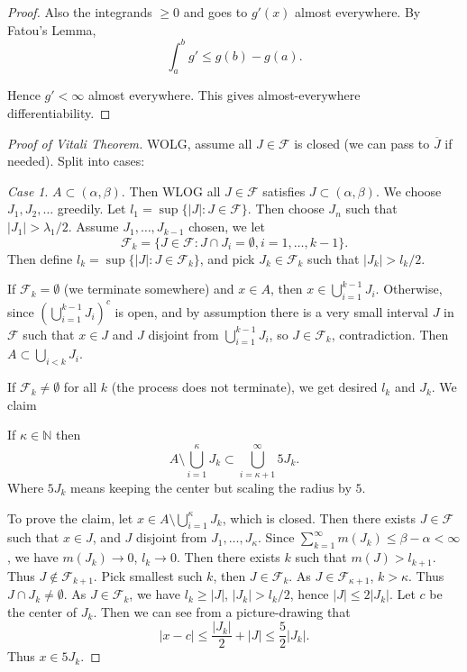 \begin{proof}
Also the integrands $\ge 0$ and goes to $g'(x)$ almost everywhere. By Fatou's Lemma,
\[
	\int _a^b g' \le  g(b) - g(a)
.\] 

Hence $g'< \infty $ almost everywhere. This gives almost-everywhere differentiability.
\end{proof}

\begin{proof}[Proof of Vitali Theorem]
	WOLG, assume all $J \in \mathcal{F}$ is closed (we can pass to $\overline{J} $ if needed). Split into cases:

	\textit{Case 1}. $A \subset (\alpha, \beta)$. Then WLOG all $J \in \mathcal{F}$ satisfies $J \subset (\alpha, \beta)$. We choose $J_1, J_2, \ldots$ greedily. Let $l_1 = \sup \{|J|: J \in \mathcal{F}\} $. Then choose $J_n$ such that $|J_1| > \lambda_1 / 2$. Assume $J_1, \ldots, J_{k-1}$ chosen, we let
	\[
		\mathcal{F}_k = \{J \in \mathcal{F}: J \cap J_i = \emptyset , i = 1,\ldots, k-1\} 
	.\] 
	Then define $l_k = \sup  \{|J|: J \in \mathcal{F}_k\} $, and pick $J_k \in \mathcal{F}_k$ such that $|J_k| > l_k / 2$.

	If $\mathcal{F}_k = \emptyset $ (we terminate somewhere) and $x \in A$, then $x \in \bigcup_{i=1} ^{k-1} J_i$. Otherwise, since $\left( \bigcup_{i=1} ^{k-1} J_i \right)^c $ is open, and by assumption there is a very small interval $J$ in $\mathcal{F}$ such that $x \in J $ and $J$ disjoint from $\bigcup_{i=1} ^{k-1} J_i$, so $ J \in \mathcal{F}_k$, contradiction. Then $A \subset \bigcup_{i < k} J_i$.

	If $\mathcal{F}_k \neq \emptyset $ for all $k$ (the process does not terminate), we get desired $l_k$ and $J_k$. We claim
	\begin{claim}
		If $\kappa \in \mathbb{N}$ then 
		\[
			A \setminus \bigcup_{i=1} ^\kappa J_k \subset \bigcup_{i = \kappa + 1} ^\infty  5 J_k
		.\] 
		Where $5J_k$ means keeping the center but scaling the radius by $5$.
	\end{claim}
	To prove the claim, let $x \in A \setminus \bigcup_{i=1} ^\kappa J_k$, which is closed. Then there exists $J \in \mathcal{F}$ such that $x \in J$, and $J$ disjoint from $J_1, \ldots, J_\kappa$. Since $\sum_{k=1}^{\infty} m(J_k) \le \beta - \alpha < \infty $, we have $m(J_k) \to  0$, $l_k \to  0$. Then there exists $k$ such that $m(J) > l_{k+1}$. Thus $J \not\in \mathcal{F}_{k+1}$. Pick smallest such $k$, then $J \in \mathcal{F}_k$. As $J \in \mathcal{F}_{\kappa + 1}$, $k > \kappa$. Thus $J \cap J_k \neq \emptyset $. As $J \in \mathcal{F}_k$, we have $l_k \ge |J|$, $|J_k| > l_{k} /2$, hence $|J| \le  2 |J_k|$. Let $c$ be the center of $J_k$. Then we can see from a picture-drawing that
	\[
		|x - c| \le \frac{|J_k|}{2}+ |J| \le \frac{5}{2} |J_k|
	.\] 
	Thus $x \in 5 J_k$.


\end{proof}
